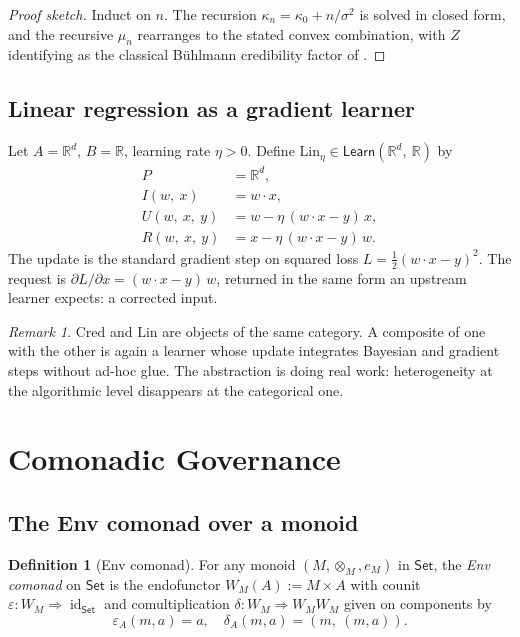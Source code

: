 \documentclass[journal,10pt]{IEEEtran}
\theoremstyle{plain}
\theoremstyle{definition}
\newtheorem{definition}[theorem]{Definition}
\theoremstyle{remark}
\newtheorem{remark}[theorem]{Remark}
\newcommand{\Set}{\mathsf{Set}}
\newcommand{\Learn}{\mathsf{Learn}}
\DeclareMathOperator{\id}{id}
\begin{document}
\begin{proof}[Proof sketch]
Induct on $n$. The recursion $\kappa_n = \kappa_0 + n/\sigma^2$ is
solved in closed form, and the recursive $\mu_n$ rearranges to the
stated convex combination, with $Z$ identifying as the classical
B\"uhlmann credibility factor of \cite{BuhlmannGisler}.
\end{proof}

\subsection{Linear regression as a gradient learner}
\label{sec:linear}

Let $A = \mathbb{R}^d$, $B = \mathbb{R}$, learning rate $\eta > 0$.
Define $\mathrm{Lin}_\eta \in \Learn(\mathbb{R}^d,\ \mathbb{R})$ by
\begin{align*}
P            &= \mathbb{R}^d, \\
I(w,\ x)     &= w \cdot x, \\
U(w,\ x,\ y) &= w - \eta\, (w \cdot x - y)\, x, \\
R(w,\ x,\ y) &= x - \eta\, (w \cdot x - y)\, w.
\end{align*}
The update is the standard gradient step on squared loss
$L = \tfrac{1}{2}(w \cdot x - y)^2$. The request is $\partial L /
\partial x = (w \cdot x - y)\, w$, returned in the same form an
upstream learner expects: a corrected input.

\begin{remark}
$\mathrm{Cred}$ and $\mathrm{Lin}$ are objects of the same category.
A composite of one with the other is again a learner whose update
integrates Bayesian and gradient steps without ad-hoc glue. The
abstraction is doing real work: heterogeneity at the algorithmic
level disappears at the categorical one.
\end{remark}

\section{Comonadic Governance}
\label{sec:governance}

\subsection{The Env comonad over a monoid}

\begin{definition}[Env comonad]\label{def:env-comonad}
For any monoid $(M, \otimes_M, e_M)$ in $\Set$, the \emph{Env
comonad} on $\Set$ is the endofunctor $W_M(A) := M \times A$ with
counit $\varepsilon \colon W_M \Rightarrow \id_\Set$ and
comultiplication $\delta \colon W_M \Rightarrow W_M W_M$ given on
components by
\[
\varepsilon_A(m, a) = a,
\quad
\delta_A(m, a) = (m,\ (m, a)).
\]
\end{definition}
\end{document}
